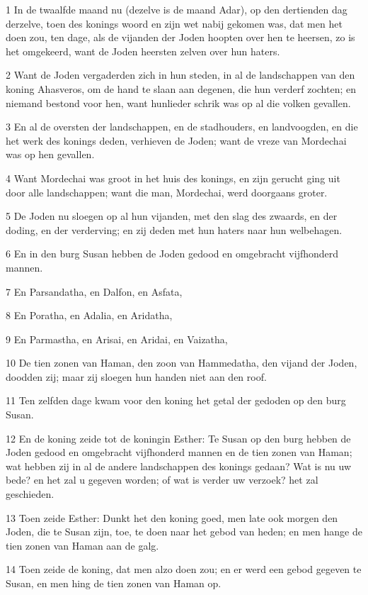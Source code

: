 \par 1 In de twaalfde maand nu (dezelve is de maand Adar), op den dertienden dag derzelve, toen des konings woord en zijn wet nabij gekomen was, dat men het doen zou, ten dage, als de vijanden der Joden hoopten over hen te heersen, zo is het omgekeerd, want de Joden heersten zelven over hun haters.
\par 2 Want de Joden vergaderden zich in hun steden, in al de landschappen van den koning Ahasveros, om de hand te slaan aan degenen, die hun verderf zochten; en niemand bestond voor hen, want hunlieder schrik was op al die volken gevallen.
\par 3 En al de oversten der landschappen, en de stadhouders, en landvoogden, en die het werk des konings deden, verhieven de Joden; want de vreze van Mordechai was op hen gevallen.
\par 4 Want Mordechai was groot in het huis des konings, en zijn gerucht ging uit door alle landschappen; want die man, Mordechai, werd doorgaans groter.
\par 5 De Joden nu sloegen op al hun vijanden, met den slag des zwaards, en der doding, en der verderving; en zij deden met hun haters naar hun welbehagen.
\par 6 En in den burg Susan hebben de Joden gedood en omgebracht vijfhonderd mannen.
\par 7 En Parsandatha, en Dalfon, en Asfata,
\par 8 En Poratha, en Adalia, en Aridatha,
\par 9 En Parmastha, en Arisai, en Aridai, en Vaizatha,
\par 10 De tien zonen van Haman, den zoon van Hammedatha, den vijand der Joden, doodden zij; maar zij sloegen hun handen niet aan den roof.
\par 11 Ten zelfden dage kwam voor den koning het getal der gedoden op den burg Susan.
\par 12 En de koning zeide tot de koningin Esther: Te Susan op den burg hebben de Joden gedood en omgebracht vijfhonderd mannen en de tien zonen van Haman; wat hebben zij in al de andere landschappen des konings gedaan? Wat is nu uw bede? en het zal u gegeven worden; of wat is verder uw verzoek? het zal geschieden.
\par 13 Toen zeide Esther: Dunkt het den koning goed, men late ook morgen den Joden, die te Susan zijn, toe, te doen naar het gebod van heden; en men hange de tien zonen van Haman aan de galg.
\par 14 Toen zeide de koning, dat men alzo doen zou; en er werd een gebod gegeven te Susan, en men hing de tien zonen van Haman op.
